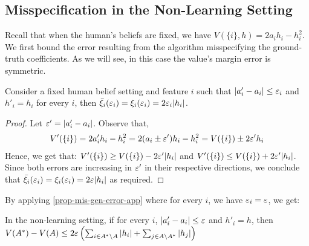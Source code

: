 \subsection{Misspecification in the Non-Learning Setting}
Recall that when the human's beliefs are fixed, we have $V(\{i\},h) = 2a_ih_i-h_i^2$.
We first bound the error resulting from the algorithm misspecifying the ground-truth coefficients. As we will see, in this case the value's margin error is symmetric.

\begin{observation}
Consider a fixed human belief setting and feature $i$ such that $|a'_i-a_i|\leq \varepsilon_i$ and $h'_i= h_i$ for every $i$, then $\bar \xi_i(\varepsilon_i)=\xi_i(\varepsilon_i) =  2\varepsilon_i |h_i|$.
\end{observation}
\begin{proof}
Let $\varepsilon' = |a'_i-a_i|$. Observe that,
    \begin{align*}
        V'(\{i\}) = 2a'_ih_i-h_i^2 = 2(a_i\pm \varepsilon')h_i-h_i^2 = V(\{i\}) \pm 2\varepsilon' h_i
    \end{align*}
    Hence, we get that: $V'(\{i\}) \geq V(\{i\}) - 2\varepsilon'|h_i|$ and $V'(\{i\}) \leq V(\{i\}) + 2\varepsilon'|h_i|$. Since both errors are increasing in $\varepsilon'$ in their respective directions, we conclude that $\bar \xi_i(\varepsilon_i)=\xi_i(\varepsilon_i) =  2\varepsilon |h_i|$ as required.
\end{proof}
By applying \cref{prop-mis-gen-error-app} where for every $i$, we have $\varepsilon_i=\varepsilon$, we get:
\begin{corollary}
In the non-learning setting, if for every $i$, $|a'_i-a_i|\leq \varepsilon$ and $h'_i=h$, then $V(A^*)-V(A) \leq 2\varepsilon \left( \sum_{i \in A^* \setminus A} |h_i| +  \sum_{j \in A \setminus A^*} |h_j| \right)$
\end{corollary}

